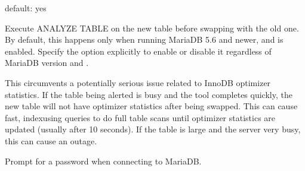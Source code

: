 \documentclass[letterpaper,10pt,english]{sphinxmanual}
\begin{document}
\begin{fulllineitems}
\label{\detokenize{mariadb-schema-change:cmdoption-mariadb-schema-change-no-analyze-before-swap}}
\sphinxAtStartPar
default: yes

\sphinxAtStartPar
Execute ANALYZE TABLE on the new table before swapping with the old one.
By default, this happens only when running MariaDB 5.6 and newer, and
 is enabled. Specify the option explicitly to enable
or disable it regardless of MariaDB version and .

\sphinxAtStartPar
This circumvents a potentially serious issue related to InnoDB optimizer
statistics. If the table being alerted is busy and the tool completes quickly,
the new table will not have optimizer statistics after being swapped. This can
cause fast, index\sphinxhyphen{}using queries to do full table scans until optimizer
statistics are updated (usually after 10 seconds). If the table is large and
the server very busy, this can cause an outage.

\end{fulllineitems}


\begin{fulllineitems}
\label{\detokenize{mariadb-schema-change:cmdoption-mariadb-schema-change-ask-pass}}
\sphinxAtStartPar
Prompt for a password when connecting to MariaDB.

\end{fulllineitems}

\end{document}
